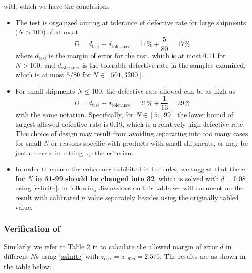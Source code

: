 \documentclass[12pt]{article}
\begin{document}
with which we have the conclusions

\begin{itemize}
    \item The test is organized aiming at tolerance of defective rate for large shipments ($N > 100$) of at most 
    $$
    D = d_{\text{test}} + d_{\text{tolerance}} = 11\% + \frac{5}{80} = 17\%
    $$
    where $d_{\text{test}}$ is the margin of error for the test, which is at most 0.11 for $N > 100$, and $d_{\text{tolerance}}$ is the tolerable defective rate in the samples examined, which is at most $5/80$ for $N\in[501, 3200]$. 
    \item For small shipments $N \leq 100$, the defective rate allowed can be as high as
    $$
    D = d_{\text{test}} + d_{\text{tolerance}} = 21\% + \frac{1}{13} = 29\%
    $$
    with the same notation. Specifically, for $N\in[51, 99]$ the lower bound of largest allowed defective rate is 0.19, which is a relatively high defective rate. This choice of design may result from avoiding separating into too many cases for small $N$ or reasons specific with products with small shipments, or may be just an error in setting up the criterion.
    \item In order to ensure the coherence exhibited in the rules, we suggest that the \textbf{$n$ for $N$ in 51-99 should be changed into 32}, which is solved with $d=0.08$ using \ref{ssfinite}. In following discussions on this table we will comment on the result with calibrated $n$ value separately besides using the originally tabled value. 
\end{itemize}

\subsubsection{Verification of \cite{OIML2016}}

Similarly, we refer to Table 2 in \cite{OIML2016} to calculate the allowed margin of error $d$ in different $N$s using \eqref{ssfinite} with $z_{\alpha/2} = z_{0.995} = 2.575$. The results are as shown in the table below:
\end{document}
